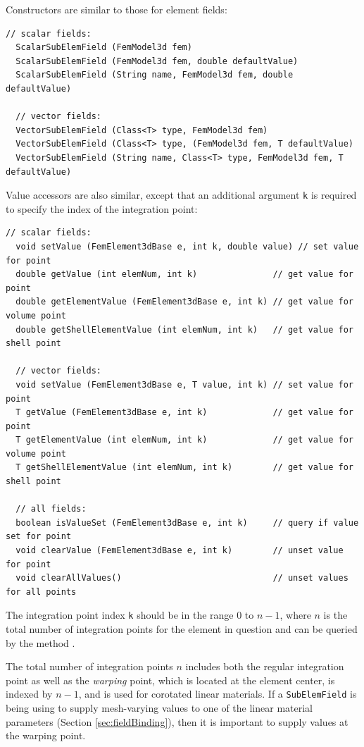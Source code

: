 Constructors are similar to those for element fields:
%
\begin{lstlisting}[]
  // scalar fields:
  ScalarSubElemField (FemModel3d fem)
  ScalarSubElemField (FemModel3d fem, double defaultValue)
  ScalarSubElemField (String name, FemModel3d fem, double defaultValue)

  // vector fields:
  VectorSubElemField (Class<T> type, FemModel3d fem)
  VectorSubElemField (Class<T> type, (FemModel3d fem, T defaultValue)
  VectorSubElemField (String name, Class<T> type, FemModel3d fem, T defaultValue)
\end{lstlisting}
%
Value accessors are also similar, except that an additional argument
{\tt k} is required to specify the index of the integration
point: 
%
\begin{lstlisting}[]
  // scalar fields:
  void setValue (FemElement3dBase e, int k, double value) // set value for point
  double getValue (int elemNum, int k)               // get value for point
  double getElementValue (FemElement3dBase e, int k) // get value for volume point
  double getShellElementValue (int elemNum, int k)   // get value for shell point

  // vector fields:
  void setValue (FemElement3dBase e, T value, int k) // set value for point
  T getValue (FemElement3dBase e, int k)             // get value for point
  T getElementValue (int elemNum, int k)             // get value for volume point
  T getShellElementValue (int elemNum, int k)        // get value for shell point

  // all fields:
  boolean isValueSet (FemElement3dBase e, int k)     // query if value set for point
  void clearValue (FemElement3dBase e, int k)        // unset value for point
  void clearAllValues()                              // unset values for all points
\end{lstlisting}
%
The integration point index {\tt k} should be in the range 0 to $n-1$,
where $n$ is the total number of integration points for the element in
question and can be queried by the method
.

\begin{sideblock}
The total number of integration points $n$ includes both the regular
integration point as well as the {\it warping} point, which is located
at the element center, is indexed by $n-1$, and is used for corotated
linear materials. If a {\tt SubElemField} is being using to supply
mesh-varying values to one of the linear material parameters (Section
\ref{sec:fieldBinding}), then it is important to supply values at the
warping point.
\end{sideblock}

